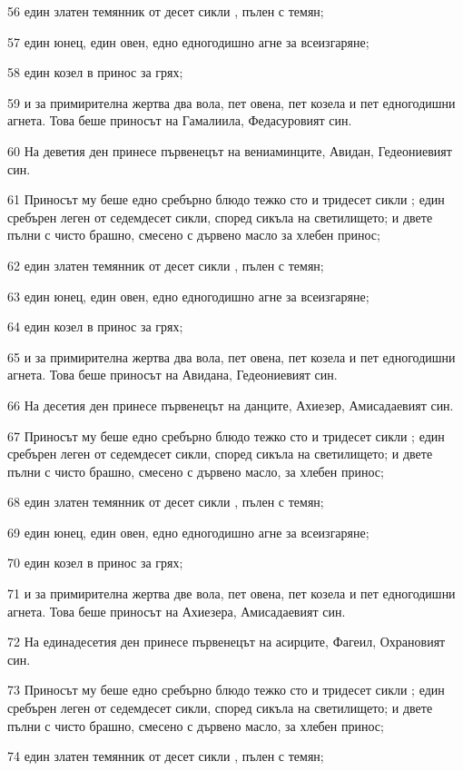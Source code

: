 \par 56 един златен темянник от десет сикли , пълен с темян;
\par 57 един юнец, един овен, едно едногодишно агне за всеизгаряне;
\par 58 един козел в принос за грях;
\par 59 и за примирителна жертва два вола, пет овена, пет козела и пет едногодишни агнета. Това беше приносът на Гамалиила, Федасуровият син.
\par 60 На деветия ден принесе първенецът на вениаминците, Авидан, Гедеониевият син.
\par 61 Приносът му беше едно сребърно блюдо тежко сто и тридесет сикли ; един сребърен леген от седемдесет сикли, според сикъла на светилището; и двете пълни с чисто брашно, смесено с дървено масло за хлебен принос;
\par 62 един златен темянник от десет сикли , пълен с темян;
\par 63 един юнец, един овен, едно едногодишно агне за всеизгаряне;
\par 64 един козел в принос за грях;
\par 65 и за примирителна жертва два вола, пет овена, пет козела и пет едногодишни агнета. Това беше приносът на Авидана, Гедеониевият син.
\par 66 На десетия ден принесе първенецът на данците, Ахиезер, Амисадаевият син.
\par 67 Приносът му беше едно сребърно блюдо тежко сто и тридесет сикли ; един сребърен леген от седемдесет сикли, според сикъла на светилището; и двете пълни с чисто брашно, смесено с дървено масло, за хлебен принос;
\par 68 един златен темянник от десет сикли , пълен с темян;
\par 69 един юнец, един овен, едно едногодишно агне за всеизгаряне;
\par 70 един козел в принос за грях;
\par 71 и за примирителна жертва две вола, пет овена, пет козела и пет едногодишни агнета. Това беше приносът на Ахиезера, Амисадаевият син.
\par 72 На единадесетия ден принесе първенецът на асирците, Фагеил, Охрановият син.
\par 73 Приносът му беше едно сребърно блюдо тежко сто и тридесет сикли ; един сребърен леген от седемдесет сикли, според сикъла на светилището; и двете пълни с чисто брашно, смесено с дървено масло, за хлебен принос;
\par 74 един златен темянник от десет сикли , пълен с темян;

